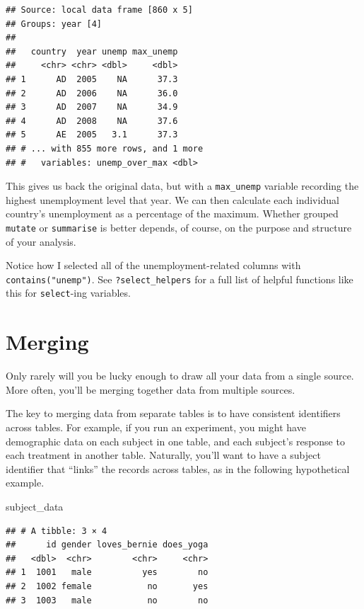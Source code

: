 \documentclass[12pt,oneside,openany]{tufte-book}
\newenvironment{Shaded}{}{}
\newcommand{\NormalTok}[1]{{#1}}
\begin{document}
\begin{verbatim}
## Source: local data frame [860 x 5]
## Groups: year [4]
## 
##   country  year unemp max_unemp
##     <chr> <chr> <dbl>     <dbl>
## 1      AD  2005    NA      37.3
## 2      AD  2006    NA      36.0
## 3      AD  2007    NA      34.9
## 4      AD  2008    NA      37.6
## 5      AE  2005   3.1      37.3
## # ... with 855 more rows, and 1 more
## #   variables: unemp_over_max <dbl>
\end{verbatim}

This gives us back the original data, but with a \texttt{max\_unemp}
variable recording the highest unemployment level that year. We can then
calculate each individual country's unemployment as a percentage of the
maximum. Whether grouped \texttt{mutate} or \texttt{summarise} is better
depends, of course, on the purpose and structure of your analysis.

Notice how I selected all of the unemployment-related columns with
\texttt{contains("unemp")}. See \texttt{?select\_helpers} for a full
list of helpful functions like this for \texttt{select}-ing variables.

\section{Merging}\label{merging}

Only rarely will you be lucky enough to draw all your data from a single
source. More often, you'll be merging together data from multiple
sources.

The key to merging data from separate tables is to have consistent
identifiers across tables. For example, if you run an experiment, you
might have demographic data on each subject in one table, and each
subject's response to each treatment in another table. Naturally, you'll
want to have a subject identifier that ``links'' the records across
tables, as in the following hypothetical example.

\begin{Shaded}
\begin{Highlighting}[]
\NormalTok{subject_data}
\end{Highlighting}
\end{Shaded}

\begin{verbatim}
## # A tibble: 3 × 4
##      id gender loves_bernie does_yoga
##   <dbl>  <chr>        <chr>     <chr>
## 1  1001   male          yes        no
## 2  1002 female           no       yes
## 3  1003   male           no        no
\end{verbatim}
\end{document}
